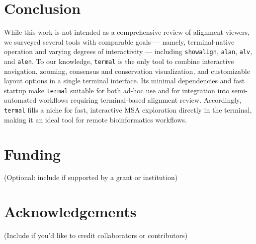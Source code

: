 \documentclass[11pt]{article}
\begin{document}
\section*{Conclusion}

While this work is not intended as a comprehensive review of alignment viewers,
we surveyed several tools with comparable goals — namely, terminal-native
operation and varying degrees of interactivity — including \texttt{showalign},
\texttt{alan}, \texttt{alv}, and \texttt{alen}.  To our knowledge,
\texttt{termal} is the only tool to combine interactive navigation, zooming,
consensus and conservation visualization, and customizable layout options in a
single terminal interface.  Its minimal dependencies and fast startup make
\texttt{termal} suitable for both ad-hoc use and for integration into
semi-automated workflows requiring terminal-based alignment review. Accordingly,
\texttt{termal} fills a niche for fast, interactive MSA exploration directly in
the terminal, making it an ideal tool for remote bioinformatics workflows.

\section*{Funding}

(Optional: include if supported by a grant or institution)

\section*{Acknowledgements}

(Include if you'd like to credit collaborators or contributors)


\end{document}
